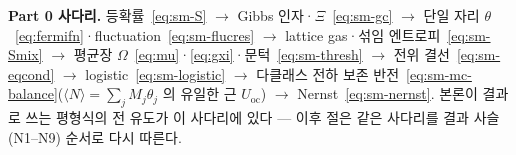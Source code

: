 \begin{keybox}
\textbf{Part 0 사다리.} 등확률~\eqref{eq:sm-S} $\to$ Gibbs 인자·$\Xi$~\eqref{eq:sm-gc} $\to$ 단일 자리
$\theta$~\eqref{eq:fermifn}·fluctuation~\eqref{eq:sm-flucres} $\to$ lattice gas·섞임 엔트로피~\eqref{eq:sm-Smix}
$\to$ 평균장 $\Omega$~\eqref{eq:mu}·\eqref{eq:gxi}·문턱~\eqref{eq:sm-thresh} $\to$ 전위
결선~\eqref{eq:sm-eqcond} $\to$ logistic~\eqref{eq:sm-logistic} $\to$ 다클래스 전하 보존
반전~\eqref{eq:sm-mc-balance}($\langle N\rangle{=}\sum_jM_j\theta_j$ 의 유일한 근 $U_\mathrm{oc}$)
$\to$ Nernst~\eqref{eq:sm-nernst}. 본론이 결과로
쓰는 평형식의 전 유도가 이 사다리에 있다 --- 이후 절은 같은 사다리를 결과 사슬(N1--N9) 순서로
다시 따른다.
\end{keybox}

